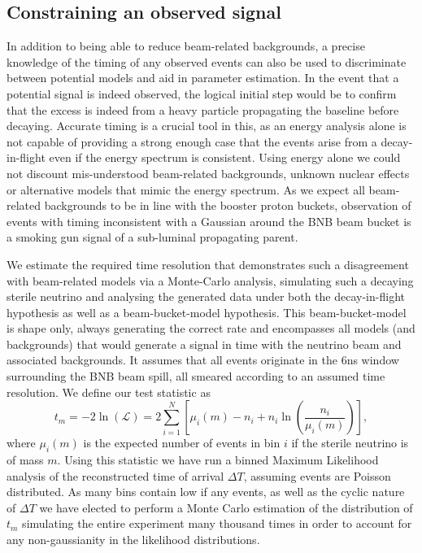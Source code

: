 \documentclass[11pt, a4paper]{article}
\begin{document}
\subsection{\label{sec:timing_physics}Constraining an observed signal}

In addition to being able to reduce beam-related backgrounds, a precise
knowledge of the timing of any observed events can also be used to discriminate
between potential models and aid in parameter estimation. In the event that a
potential signal is indeed observed, the logical initial step would be to
confirm that the excess is indeed from a heavy particle propagating the
baseline before decaying. Accurate timing is a crucial tool in this, as an
energy analysis alone is not capable of providing a strong enough case that the
events arise from a decay-in-flight even if the energy spectrum is consistent.
Using energy alone we could not discount mis-understood beam-related
backgrounds, unknown nuclear effects or alternative models that mimic the
energy spectrum. As we expect all beam-related backgrounds to be in line with
the booster proton buckets, observation of events with timing inconsistent with
a Gaussian around the BNB beam bucket is a smoking gun signal of a sub-luminal
propagating parent. 

We estimate the required time resolution that demonstrates such a disagreement
with beam-related models via a Monte-Carlo analysis, simulating
such a decaying sterile neutrino and analysing the generated data under both the
decay-in-flight hypothesis as well as a beam-bucket-model hypothesis.  This
beam-bucket-model is shape only, always generating the correct rate and
encompasses all models (and backgrounds) that would generate a signal in time
with the neutrino beam and associated backgrounds. It assumes that all events
originate in the 6ns window surrounding the BNB beam spill, all smeared
according to an assumed time resolution. We define our test statistic  as
\cite{Agashe:2014kda} \[ t_m = -2 \ln \left(\mathcal{L}\right) =  2
\sum_{i=1}^N \left[ \mu_i(m)-n_i +n_i \ln(\frac{n_i}{\mu_i(m)})  \right], \]
where $\mu_i(m)$ is the expected number of events in bin $i$ if the sterile neutrino is
of mass $m$. Using this statistic we have run a binned
Maximum Likelihood analysis of the reconstructed time of arrival $\Delta T$,
assuming events are Poisson distributed.  As many bins contain low
if any events, as well as the cyclic nature of $\Delta T$ we have elected to
perform a Monte Carlo estimation of the distribution of $t_m$ simulating the
entire experiment many thousand times in order to account for any
non-gaussianity in the likelihood distributions. 
\end{document}
